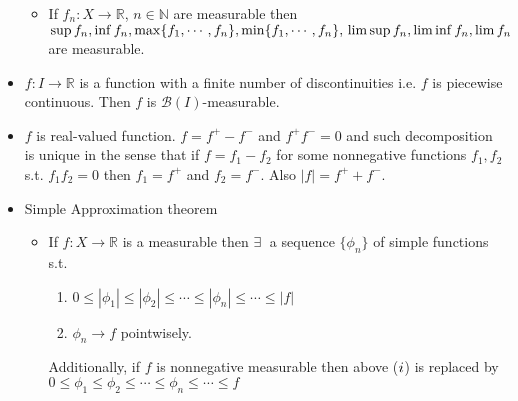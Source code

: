 \documentclass[12pt]{article}
\newcommand{\N}{\mathbb{N}}
\newcommand{\R}{\mathbb{R}}
\newcommand{\exist}{\exists \;}
\begin{document}
\begin{itemize}
\begin{itemize}
        \item If $f_n : X\rightarrow \R$, $n\in \N$ are measurable then $\sup f_n, \inf f_n, \max\{f_1, \cdots, f_n\}, \min\{f_1, \cdots, f_n\},\\ \limsup f_n, \liminf f_n, \lim f_n$ are measurable.
    \end{itemize} 
    \item $f:I\rightarrow \R$ is a function with a finite number of discontinuities i.e. $f$ is piecewise continuous. Then $f$ is $\mathcal{B}(I)$-measurable.
    \item $f$ is real-valued function. $f= f^+ - f^-$ and $f^+f^-=0$ and such decomposition is unique in the sense that if $f= f_1-f_2$ for some nonnegative functions $f_1, f_2$ \; s.t. $f_1f_2=0$ then $f_1=f^+$ and $f_2=f^-$. Also $|f|=f^+ + f^-$.
    \item Simple Approximation theorem
    \begin{itemize}
        \item If $f: X\rightarrow \R$ is a measurable then $\exist$ a sequence $\{\phi_n\}$ of simple functions s.t. 
        \begin{enumerate}
            \item $0\leq |\phi_1|\leq |\phi_2|\leq \cdots \leq |\phi_n|\leq \cdots \leq |f|$
            \item $\phi_n \rightarrow f$ pointwisely.
        \end{enumerate}
        Additionally, if $f$ is nonnegative measurable then above ($\romannumeral 1$) is replaced by \\ $0\leq \phi_1\leq \phi_2\leq \cdots \leq \phi_n\leq \cdots \leq f$
    \end{itemize}
\end{itemize}
\smallskip
\end{document}
